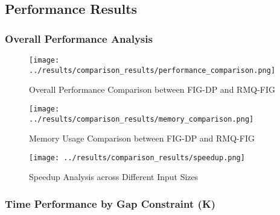 \documentclass{article}
\begin{document}
\subsection{Performance Results}

\subsubsection{Overall Performance Analysis}
\begin{figure}[h]
    \centering
    \texttt{[image: ../results/comparison\_results/performance\_comparison.png]}
    \caption{Overall Performance Comparison between FIG-DP and RMQ-FIG}
    \label{fig:perf_comparison}
\end{figure}

\begin{figure}[h]
    \centering
    \texttt{[image: ../results/comparison\_results/memory\_comparison.png]}
    \caption{Memory Usage Comparison between FIG-DP and RMQ-FIG}
    \label{fig:memory_comparison}
\end{figure}

\begin{figure}[h]
    \centering
    \texttt{[image: ../results/comparison\_results/speedup.png]}
    \caption{Speedup Analysis across Different Input Sizes}
    \label{fig:speedup}
\end{figure}

\subsubsection{Time Performance by Gap Constraint (K)}
\end{document}
